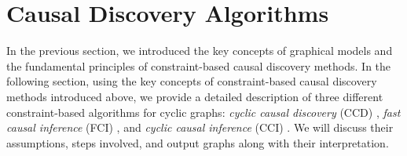 \documentclass[twoside, 11pt]{article}
\newcommand*{\figref}[2][]{%
  \hyperref[{fig:#2}]{%
    Figure~\ref*{fig:#2}%
    \ifx\\#1\\%
    \else
      #1%
    \fi
  }%
}
\begin{document}







\section{Causal Discovery Algorithms} \label{cdalgo}

In the previous section, we introduced the key concepts of graphical models and the fundamental principles of constraint-based causal discovery methods. In the following section, using the key concepts of constraint-based causal discovery methods introduced above, we provide a detailed description of three different constraint-based algorithms for cyclic graphs: \textit{cyclic causal discovery} (CCD) \citep{Richardson1996a}, \textit{fast causal inference} (FCI) \citep{spirtes_causal_1995}, and \textit{cyclic causal inference} (CCI) \citep{strobl2019}. We will discuss their assumptions, steps involved, and output graphs along with their interpretation.

\end{document}
